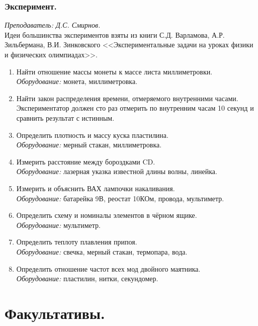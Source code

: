 \documentclass[11pt]{article}
\newlength{\h}
\newlength{\x}
\begin{document}
\subsubsection{Эксперимент.}
\label{sec:exp11}

\textit{Преподаватель: Д.С. Смирнов.}\\

Идеи большинства экспериментов взяты из книги С.Д. Варламова,
А.Р. Зильбермана, В.И. Зинковского <<Экспериментальные задачи на
уроках физики и физических олимпиадах>>.

\begin{enumerate}
\item Найти отношение массы монеты к массе листа миллиметровки.\\
  \textit{Оборудование:} монета, миллиметровка.
\item Найти закон распределения времени, отмеряемого внутренними
  часами. Экспериментатор должен сто раз отмерить по внутренним часам
  10 секунд и сравнить результат с истинным.
\item Определить плотность и массу куска пластилина.\\
  \textit{Оборудование:} мерный стакан, миллиметровка.
\item Измерить расстояние между бороздками CD.\\
  \textit{Оборудование:} лазерная указка известной длины волны,
  линейка.
\item Измерить и объяснить ВАХ лампочки накаливания.\\
  \textit{Оборудование:} батарейка 9В, реостат 10КОм, провода, мультиметр. 
\item Определить схему и номиналы элементов в чёрном ящике.\\
  \textit{Оборудование:} мультиметр. 
\item Определить теплоту плавления припоя.\\
  \textit{Оборудование:} свечка, мерный стакан, термопара, вода. 
\item Определить отношение частот всех мод двойного
  маятника.\\
  \textit{Оборудование:} пластилин, нитки, секундомер.
\end{enumerate}

\section{Факультативы.}
\label{sec:spec}
\end{document}
